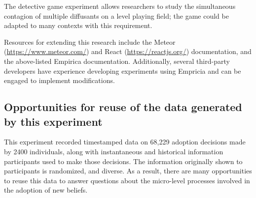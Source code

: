 \documentclass{article}
\begin{document}
The detective game experiment allows researchers to study the simultaneous contagion of multiple diffusants on a level playing field; the game could be adapted to many contexts with this requirement.

Resources for extending this research include the Meteor (\url{https://www.meteor.com/}) and React (\url{https://reactjs.org/}) documentation, and the above-listed Empirica documentation. Additionally, several third-party developers have experience developing experiments using Empricia and can be engaged to implement modifications. 

\subsection{Opportunities for reuse of the data generated by this experiment}
This experiment recorded timestamped data on 68,229 adoption decisions made by 2400 individuals, along with instantaneous and historical information participants used to make those decisions. The information originally shown to participants is randomized, and diverse. As a result, there are many opportunities to reuse this data to answer questions about the micro-level processes involved in the adoption of new beliefs. 



\end{document}
